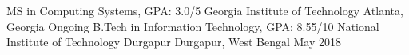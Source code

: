 
\begin{cventries}
  \cventry
  {MS in Computing Systems, GPA: 3.0/5}
  {Georgia Institute of Technology}
  {Atlanta, Georgia}
  {Ongoing}
  {}
  \cventry
    {B.Tech in Information Technology, GPA: 8.55/10} %
    {National Institute of Technology Durgapur} %
    {Durgapur, West Bengal} %
    {May 2018} %
    {}
\end{cventries}
